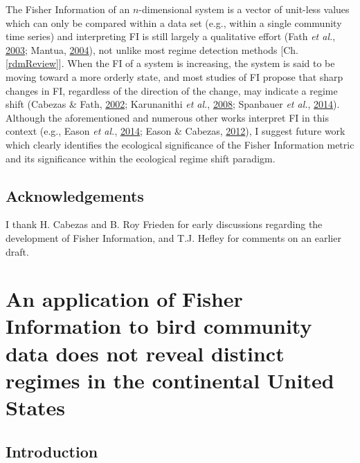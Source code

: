 \documentclass[12pt,twoside,openany]{reedthesis}
\begin{document}
The Fisher Information of an \(n\)-dimensional system is a vector of unit-less values which can only be compared within a data set (e.g., within a single community time series) and interpreting FI is still largely a qualitative effort (Fath \emph{et al.}, \protect\hyperlink{ref-fath_regime_2003}{2003}; Mantua, \protect\hyperlink{ref-mantua_methods_2004}{2004}), not unlike most regime detection methods {[}Ch. \ref{rdmReview}{]}. When the FI of a system is increasing, the system is said to be moving toward a more orderly state, and most studies of FI propose that sharp changes in FI, regardless of the direction of the change, may indicate a regime shift (Cabezas \& Fath, \protect\hyperlink{ref-cabezas_towards_2002}{2002}; Karunanithi \emph{et al.}, \protect\hyperlink{ref-karunanithi_detection_2008}{2008}; Spanbauer \emph{et al.}, \protect\hyperlink{ref-spanbauer_prolonged_2014}{2014}). Although the aforementioned and numerous other works interpret FI in this context (e.g., Eason \emph{et al.}, \protect\hyperlink{ref-eason2014managing}{2014}; Eason \& Cabezas, \protect\hyperlink{ref-eason_evaluating_2012}{2012}), I suggest future work which clearly identifies the ecological significance of the Fisher Information metric and its significance within the ecological regime shift paradigm.

\hypertarget{acknowledgements}{%
\section{Acknowledgements}\label{acknowledgements}}

I thank H. Cabezas and B. Roy Frieden for early discussions regarding the development of Fisher Information, and T.J. Hefley for comments on an earlier draft.

\hypertarget{fisherSpatial}{%
\chapter{An application of Fisher Information to bird community data does not reveal distinct regimes in the continental United States}\label{fisherSpatial}}

\hypertarget{introduction-2}{%
\section{Introduction}\label{introduction-2}}
\end{document}
